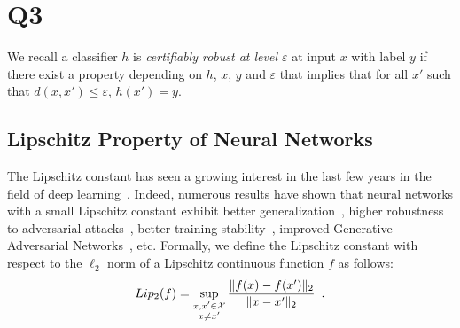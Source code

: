 \section{Q3}

We recall a classifier $h$ is \emph{certifiably robust at level $\varepsilon$} at input $x$ with label $y$ if there exist a property depending on $h$, $x$, $y$ and $\varepsilon$ that implies that for all $x'$ such that $d(x,x')\leq\varepsilon$, $h(x') = y$.




\subsection{Lipschitz Property of Neural Networks}


The Lipschitz constant has seen a growing interest in the last few years in the field of deep learning~\citep{scaman2018lipschitz,fazlyab2019efficient,combettes2020lipschitz,bethune2021many}.
Indeed, numerous results have shown that neural networks with a small Lipschitz constant exhibit better generalization~\citep{bartlett2017spectrally}, higher robustness to adversarial attacks~\citep{szegedy2014intriguing,farnia2018generalizable,tsuzuku2018lipschitz}, better training stability~\citep{xiao2018dynamical,trockman2021orthogonalizing}, improved Generative Adversarial Networks~\citep{arjovsky2017wasserstein}, etc.
Formally, we define the Lipschitz constant with respect to the $\ell_2$ norm of a Lipschitz continuous function $f$ as follows:
\begin{equation*}
  Lip_{2}{(f)} = \sup_{\substack{x, x' \in \mathcal{X} \\ x \neq x'}} \frac{\lVert f(x) - f(x') \rVert_2}{\lVert x - x' \rVert_2} \enspace.
\end{equation*}

